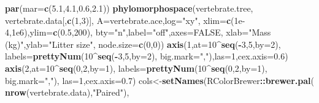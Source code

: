 \documentclass[fleqn,10pt,lineno]{wlpeerj} %
\newenvironment{Shaded}{\begin{snugshade}}{\end{snugshade}}
\newcommand{\AttributeTok}[1]{\textcolor[rgb]{0.13,0.29,0.53}{#1}}
\newcommand{\ConstantTok}[1]{\textcolor[rgb]{0.56,0.35,0.01}{#1}}
\newcommand{\DecValTok}[1]{\textcolor[rgb]{0.00,0.00,0.81}{#1}}
\newcommand{\FloatTok}[1]{\textcolor[rgb]{0.00,0.00,0.81}{#1}}
\newcommand{\FunctionTok}[1]{\textcolor[rgb]{0.13,0.29,0.53}{\textbf{#1}}}
\newcommand{\NormalTok}[1]{#1}
\newcommand{\OtherTok}[1]{\textcolor[rgb]{0.56,0.35,0.01}{#1}}
\newcommand{\SpecialCharTok}[1]{\textcolor[rgb]{0.81,0.36,0.00}{\textbf{#1}}}
\newcommand{\StringTok}[1]{\textcolor[rgb]{0.31,0.60,0.02}{#1}}
\begin{document}
\begin{Shaded}
\begin{Highlighting}[]
\FunctionTok{par}\NormalTok{(}\AttributeTok{mar=}\FunctionTok{c}\NormalTok{(}\FloatTok{5.1}\NormalTok{,}\FloatTok{4.1}\NormalTok{,}\FloatTok{0.6}\NormalTok{,}\FloatTok{2.1}\NormalTok{))}
\FunctionTok{phylomorphospace}\NormalTok{(vertebrate.tree,}
\NormalTok{  vertebrate.data[,}\FunctionTok{c}\NormalTok{(}\DecValTok{1}\NormalTok{,}\DecValTok{3}\NormalTok{)],}
  \AttributeTok{A=}\NormalTok{vertebrate.ace,}\AttributeTok{log=}\StringTok{"xy"}\NormalTok{,}
  \AttributeTok{xlim=}\FunctionTok{c}\NormalTok{(}\FloatTok{1e{-}4}\NormalTok{,}\FloatTok{1e6}\NormalTok{),}\AttributeTok{ylim=}\FunctionTok{c}\NormalTok{(}\FloatTok{0.5}\NormalTok{,}\DecValTok{200}\NormalTok{),}
  \AttributeTok{bty=}\StringTok{"n"}\NormalTok{,}\AttributeTok{label=}\StringTok{"off"}\NormalTok{,}\AttributeTok{axes=}\ConstantTok{FALSE}\NormalTok{,}
  \AttributeTok{xlab=}\StringTok{"Mass (kg)"}\NormalTok{,}\AttributeTok{ylab=}\StringTok{"Litter size"}\NormalTok{,}
  \AttributeTok{node.size=}\FunctionTok{c}\NormalTok{(}\DecValTok{0}\NormalTok{,}\DecValTok{0}\NormalTok{))}
\FunctionTok{axis}\NormalTok{(}\DecValTok{1}\NormalTok{,}\AttributeTok{at=}\DecValTok{10}\SpecialCharTok{\^{}}\FunctionTok{seq}\NormalTok{(}\SpecialCharTok{{-}}\DecValTok{3}\NormalTok{,}\DecValTok{5}\NormalTok{,}\AttributeTok{by=}\DecValTok{2}\NormalTok{),}
  \AttributeTok{labels=}\FunctionTok{prettyNum}\NormalTok{(}\DecValTok{10}\SpecialCharTok{\^{}}\FunctionTok{seq}\NormalTok{(}\SpecialCharTok{{-}}\DecValTok{3}\NormalTok{,}\DecValTok{5}\NormalTok{,}\AttributeTok{by=}\DecValTok{2}\NormalTok{),}
  \AttributeTok{big.mark=}\StringTok{","}\NormalTok{),}\AttributeTok{las=}\DecValTok{1}\NormalTok{,}\AttributeTok{cex.axis=}\FloatTok{0.6}\NormalTok{)}
\FunctionTok{axis}\NormalTok{(}\DecValTok{2}\NormalTok{,}\AttributeTok{at=}\DecValTok{10}\SpecialCharTok{\^{}}\FunctionTok{seq}\NormalTok{(}\DecValTok{0}\NormalTok{,}\DecValTok{2}\NormalTok{,}\AttributeTok{by=}\DecValTok{1}\NormalTok{),}
  \AttributeTok{labels=}\FunctionTok{prettyNum}\NormalTok{(}\DecValTok{10}\SpecialCharTok{\^{}}\FunctionTok{seq}\NormalTok{(}\DecValTok{0}\NormalTok{,}\DecValTok{2}\NormalTok{,}\AttributeTok{by=}\DecValTok{1}\NormalTok{),}
  \AttributeTok{big.mark=}\StringTok{","}\NormalTok{),}
  \AttributeTok{las=}\DecValTok{1}\NormalTok{,}\AttributeTok{cex.axis=}\FloatTok{0.7}\NormalTok{)}
\NormalTok{cols}\OtherTok{\textless{}{-}}\FunctionTok{setNames}\NormalTok{(RColorBrewer}\SpecialCharTok{::}\FunctionTok{brewer.pal}\NormalTok{(}
  \FunctionTok{nrow}\NormalTok{(vertebrate.data),}\StringTok{"Paired"}\NormalTok{),}

\end{Highlighting}
\end{Shaded}
\end{document}
